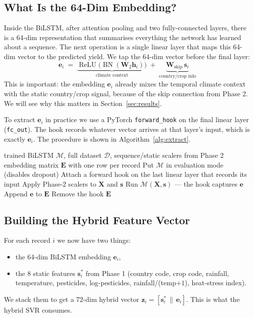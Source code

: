 \documentclass[conference]{IEEEtran}
\begin{document}
\subsection{What Is the 64-Dim Embedding?}
Inside the BiLSTM, after attention pooling and two fully-connected layers, there is a 64-dim representation that summarises everything the network has learned about a sequence. The next operation is a single linear layer that maps this 64-dim vector to the predicted yield. We tap the 64-dim vector before the final layer:
\begin{equation}
\mathbf{e}_i \;=\; \underbrace{\operatorname{ReLU}\!\big(\operatorname{BN}(\mathbf{W}_2 \mathbf{h}_i)\big)}_{\text{climate context}} \;+\; \underbrace{\mathbf{W}_{\text{skip}}\,\mathbf{s}_i}_{\text{country/crop info}}
\end{equation}
This is important: the embedding $\mathbf{e}_i$ already mixes the temporal climate context with the static country/crop signal, because of the skip connection from Phase 2. We will see why this matters in Section~\ref{sec:results}.

To extract $\mathbf{e}_i$ in practice we use a PyTorch \texttt{forward\_hook} on the final linear layer (\texttt{fc\_out}). The hook records whatever vector arrives at that layer's input, which is exactly $\mathbf{e}_i$. The procedure is shown in Algorithm~\ref{alg:extract}.

\begin{algorithm}[H]
\caption{Extract BiLSTM Embeddings for the Whole Dataset}\label{alg:extract}
\begin{algorithmic}[1]
\Require trained BiLSTM $\mathcal{M}$, full dataset $\mathcal{D}$, sequence/static scalers from Phase 2
\Ensure embedding matrix $\mathbf{E}$ with one row per record
\State Put $\mathcal{M}$ in evaluation mode (disables dropout)
\State Attach a forward hook on the last linear layer that records its input
    \State Apply Phase-2 scalers to $\mathbf{X}$ and $\mathbf{s}$
    \State Run $\mathcal{M}(\mathbf{X}, \mathbf{s})$ — the hook captures $\mathbf{e}$
    \State Append $\mathbf{e}$ to $\mathbf{E}$
\EndFor
\State Remove the hook
\State \Return $\mathbf{E}$
\end{algorithmic}
\end{algorithm}

\subsection{Building the Hybrid Feature Vector}
For each record $i$ we now have two things:
\begin{itemize}
    \item the 64-dim BiLSTM embedding $\mathbf{e}_i$,
    \item the 8 static features $\mathbf{s}^{*}_i$ from Phase 1 (country code, crop code, rainfall, temperature, pesticides, log-pesticides, rainfall/(temp$+1$), heat-stress index).
\end{itemize}
We stack them to get a 72-dim hybrid vector $\mathbf{z}_i = [\mathbf{s}^{*}_i \,\|\, \mathbf{e}_i]$. This is what the hybrid SVR consumes.
\end{document}
